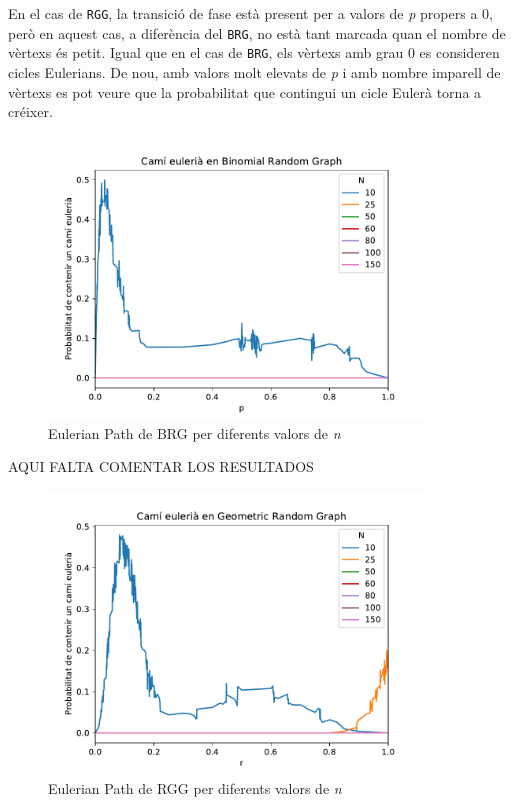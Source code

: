 En el cas de \texttt{RGG}, la transició de fase està present per a valors de \textit{p} propers a 0, però en aquest cas, a diferència del \texttt{BRG}, no està tant marcada quan el nombre de vèrtexs és petit. Igual que en el cas de \texttt{BRG}, els vèrtexs amb grau 0 es consideren cicles Eulerians. De nou, amb valors molt elevats de \textit{p} i amb nombre imparell de vèrtexs es pot veure que la probabilitat que contingui un cicle Eulerà torna a créixer. %

\begin{figure}[H]
    \centering
    \includegraphics[width=10cm]{plots/BRG_eulerianPath.pdf}
    \caption{Eulerian Path de BRG per diferents valors de \textit{n}}
    \label{fig:connect_04}
\end{figure}

AQUI FALTA COMENTAR LOS RESULTADOS

\begin{figure}[H]
    \centering
    \includegraphics[width=10cm]{plots/GRG_eulerianPath.pdf}
    \caption{Eulerian Path de RGG per diferents valors de \textit{n}}
    \label{fig:connect_04}
\end{figure}

